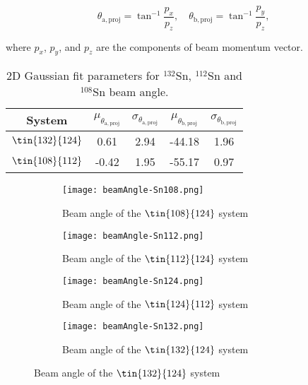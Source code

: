 
\begin{equation}
  \theta_\mathrm{a,proj}=\tan^{-1}\frac{p_x}{p_z},\quad
  \theta_\mathrm{b,proj}=\tan^{-1}\frac{p_y}{p_z},
  \label{beamAngle}
\end{equation}

where $p_x$, $p_y$, and $p_z$ are the components of beam momentum vector.



\begin{table}[H]
  \begin{center}
    \begin{tabular}{ccccc}
      \hline 
      System & $\mu_{\theta_\mathrm{a,proj}}$ &
      $\sigma_{\theta_\mathrm{a,proj}}$ & $\mu_{\theta_\mathrm{b,proj}}$ &
      $\sigma_{\theta_\mathrm{b,proj}}$ \\
      \hline\hline 
      $\tin{132}{124}$ & 0.61 & 2.94 & -44.18 & 1.96 \\
      $\tin{108}{112}$ & -0.42 & 1.95 & -55.17 & 0.97 \\
      \hline
    \end{tabular}
    \caption{2D Gaussian fit parameters for $^{132}$Sn, $^{112}$Sn and
      $^{108}$Sn beam angle. \label{beamAngleParameters}}
  \end{center}
\end{table}

\begin{figure}[!htb]
    \centering
    \begin{subfigure}[t]{0.45\textwidth}
        \centering
        \texttt{[image: beamAngle-Sn108.png]} 
        \caption{Beam angle of the $\tin{108}{124}$ system} \label{fig:beamangle108}
    \end{subfigure}
    \hfill
    \begin{subfigure}[t]{0.45\textwidth}
        \centering
        \texttt{[image: beamAngle-Sn112.png]} 
        \caption{Beam angle of the $\tin{112}{124}$ system} \label{fig:beamangle112}
    \end{subfigure}
    
    \begin{subfigure}[t]{0.45\textwidth}
        \centering
        \texttt{[image: beamAngle-Sn124.png]} 
        \caption{Beam angle of the $\tin{124}{112}$ system} \label{fig:beamangle124}
    \end{subfigure}
    \hfill
    \begin{subfigure}[t]{0.45\textwidth}
        \centering
        \texttt{[image: beamAngle-Sn132.png]} 
        \caption{Beam angle of the $\tin{132}{124}$ system} \label{fig:beamangle132}
    \end{subfigure}
\label{fig:beamangle}
\end{figure}



